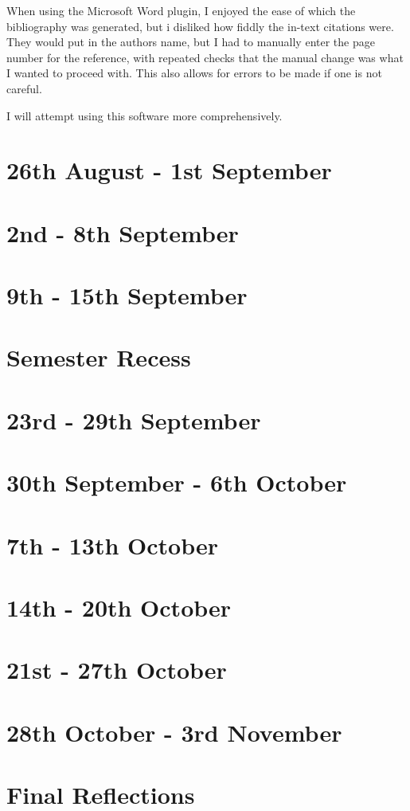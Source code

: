 \documentclass{article}
\begin{document}
When using the Microsoft Word plugin, I enjoyed the ease of which the bibliography was generated, but i disliked how fiddly the in-text citations were. They would put in the authors name, but I had to manually enter the page number for the reference, with repeated checks that the manual change was what I wanted to proceed with. This also allows for errors to be made if one is not careful. 

I will attempt using this software more comprehensively.

\section{26th August - 1st September}

\section{2nd - 8th September}

\section{9th - 15th September}

\section*{Semester Recess}

\section{23rd - 29th September}

\section{30th September - 6th October}

\section{7th - 13th October}

\section{14th - 20th October}

\section{21st - 27th October}

\section{28th October - 3rd November}

\section*{Final Reflections}
\end{document}
